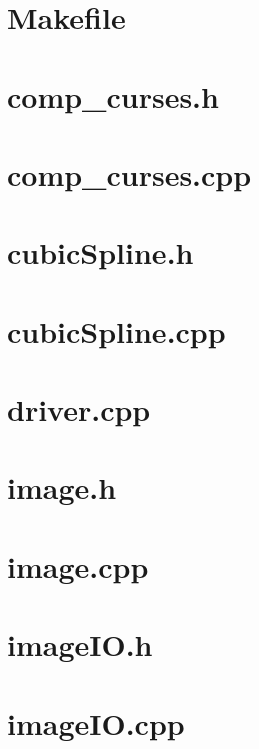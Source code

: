 \documentclass[pdftex]{article}
\begin{document}


\pagestyle{fancy}
\lhead{}
\cfoot{}
\renewcommand{\footrulewidth}{0.4pt}

\tableofcontents

\cfoot{}
\renewcommand{\footrulewidth}{0.4pt}

\section{Makefile}

\small
	

\section{comp\_curses.h}

	

\section{comp\_curses.cpp}

\small
	

\section{cubicSpline.h}

\small
	

\section{cubicSpline.cpp}

\small
	

\section{driver.cpp}

\small
	

\section{image.h}

\small
	

\section{image.cpp}

\small
	

\section{imageIO.h}

\small
	

\section{imageIO.cpp}

\small
	
\end{document}
